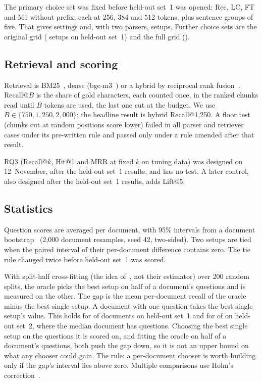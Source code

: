The primary choice set was fixed before held-out set~1 was opened: Rec, LC, FT and M1 without prefix, each at 256, 384 and
512 tokens, plus sentence groups of five. That gives \RQonePrimarySettings{}
settings and, with two parsers, \RQoneSetups{} setups. Further choice sets are the original grid (\RQoneOriginalSetups{} setups on held-out set~1) and
the full grid (\HeldOutSetups{}).

\subsection{Retrieval and scoring}\label{sec:scoring}

Retrieval is BM25~\cite{bm25}, dense (bge-m3~\cite{chen2024m3}) or a hybrid by
reciprocal rank fusion~\cite{rrf}.
Recall@$B$ is the share of gold characters, each counted once, in the ranked
chunks read until $B$ tokens are used, the last one cut at the budget. We use $B \in \{750, 1{,}250, 2{,}000\}$; the headline result
is hybrid Recall@1,250. A floor test (chunks cut at random positions score \SanityFloorLower{} lower) failed
in all \SanityFloorFailedOriginal{} parser and retriever cases under its
pre-written rule and passed only under a rule amended after that result.

RQ3 (Recall@$k$, Hit@1 and MRR at fixed $k$ on tuning data) was designed on
12~November, after the held-out set~1 results, and has no test. A later control, also designed after
the held-out set~1 results, adds Lift@5.

\subsection{Statistics}\label{sec:stats}

Question scores are averaged per document, with 95\% intervals from a document
bootstrap~\cite{bootstrap} (2,000 document resamples, seed 42, two-sided). Two setups are tied when the paired interval of their per-document
difference contains zero. The tie rule changed twice before held-out set~1 was scored.

With split-half cross-fitting (the idea of~\cite{crossfitting}, not their
estimator) over 200 random splits, the oracle picks the best setup on half of a document's questions and
is measured on the other. The gap is the mean per-document recall of the oracle minus the best single setup. A document
with one question takes the best single setup's value. This holds for
\RQoneOneQuestionDocuments{} of \RQoneDocuments{} documents on held-out set~1 and
for \RQoneHTwoOneQuestionDocuments{} of \RQoneHTwoDropRuleDocuments{} on held-out
set~2, where the median document has \RQoneHTwoMedianQuestions{} questions. Choosing the best single setup on the questions it is scored on, and fitting the
oracle on half of a document's questions, both push the gap down, so it is not an
upper bound on what any chooser could gain. The rule: a per-document chooser is worth building only if the gap's interval lies
above zero. Multiple comparisons use Holm's correction~\cite{holm}.

